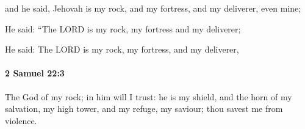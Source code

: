 			\begin{versebox}
					\item[BHS] 
					\item[ASV] and he said, Jehovah is my rock, and my fortress, and my deliverer, even mine;
					\item[NIV] He said: “The LORD is my rock, my fortress and my deliverer;
					\item[NRSV] He said: The LORD is my rock, my fortress, and my deliverer,
			\end{versebox}

		\paragraph{2 Samuel 22:3} %
			\label{2SAMUEL-22-3}

			The God of my rock; in him will I trust: he is my shield, and the horn of my salvation, my high tower, and my refuge, my saviour; thou savest me from violence.

